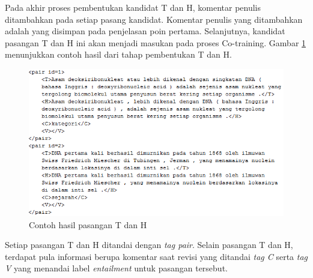 Pada akhir proses pembentukan kandidat T dan H, komentar penulis ditambahkan pada setiap pasang kandidat. Komentar penulis yang ditambahkan adalah yang disimpan pada penjelasan poin pertama. Selanjutnya, kandidat pasangan T dan H ini akan menjadi masukan pada proses Co-training. Gambar \ref{fig:T-H-pair} menunjukkan contoh hasil dari tahap pembentukan T dan H.
\begin{figure}
	\centering
	\includegraphics[width=0.85\linewidth]{pics/T-H-pair}
	\caption{Contoh hasil pasangan T dan H}
	\label{fig:T-H-pair}
\end{figure}
Setiap pasangan T dan H ditandai dengan \textit{tag pair}. Selain pasangan T dan H, terdapat pula informasi berupa komentar saat revisi yang ditandai \textit{tag C} serta \textit{tag V} yang menandai label \textit{entailment} untuk pasangan tersebut.

